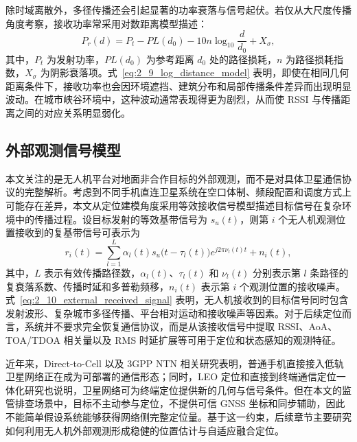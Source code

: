 除时域离散外，多径传播还会引起显著的功率衰落与信号起伏。若仅从大尺度传播角度考察，接收功率常采用对数距离模型描述：
\begin{equation}
P_r(d)
=
P_t
-
PL(d_0)
-
10n\log_{10}\frac{d}{d_0}
+
X_{\sigma},
\label{eq:2_9_log_distance_model}
\end{equation}
其中，$P_t$ 为发射功率，$PL(d_0)$ 为参考距离 $d_0$ 处的路径损耗，$n$ 为路径损耗指数，$X_{\sigma}$ 为阴影衰落项。式~\eqref{eq:2_9_log_distance_model} 表明，即使在相同几何距离条件下，接收功率也会因环境遮挡、建筑分布和局部传播条件差异而出现明显波动。在城市峡谷环境中，这种波动通常表现得更为剧烈，从而使 RSSI 与传播距离之间的对应关系明显弱化\cite{TR38901}。


\subsection{外部观测信号模型}
\label{subsec:2_2_2}

本文关注的是无人机平台对地面非合作目标的外部观测，而不是对具体卫星通信协议的完整解析。考虑到不同手机直连卫星系统在空口体制、频段配置和调度方式上可能存在差异，本文从定位建模角度采用等效接收信号模型描述目标信号在复杂环境中的传播过程。设目标发射的等效基带信号为 \(s_u(t)\)，则第 \(i\) 个无人机观测位置接收到的复基带信号可表示为
\begin{equation}
r_i(t)
=
\sum_{l=1}^{L}
\alpha_l(t)
s_u\big(t-\tau_l(t)\big)
e^{j2\pi \nu_l(t)t}
+
n_i(t),
\label{eq:2_10_external_received_signal}
\end{equation}
其中，\(L\) 表示有效传播路径数，\(\alpha_l(t)\)、\(\tau_l(t)\) 和 \(\nu_l(t)\) 分别表示第 \(l\) 条路径的复衰落系数、传播时延和多普勒频移，\(n_i(t)\) 表示第 \(i\) 个观测位置的接收噪声。式~\eqref{eq:2_10_external_received_signal} 表明，无人机接收到的目标信号同时包含发射波形、复杂城市多径传播、平台相对运动和接收噪声等因素。对于后续定位而言，系统并不要求完全恢复通信协议，而是从该接收信号中提取 RSSI、AoA、TOA/TDOA 相关量以及 RMS 时延扩展等可用于定位和状态感知的观测特征。

近年来，Direct-to-Cell 以及 3GPP NTN 相关研究表明，普通手机直接接入低轨卫星网络正在成为可部署的通信形态\cite{Lin2021NTN,He2024DirectSmartphone,GarciaCabeza2025DirectToCell}；同时，LEO 定位和直接到终端通信定位一体化研究也说明，卫星网络可为终端定位提供新的几何与信号条件\cite{Dureppagari2025LEOPositioning,DeGaudenzi2026D2DPartI,DeGaudenzi2026D2DPartII}。但在本文的监管排查场景中，目标不主动参与定位，不提供可信 GNSS 坐标和同步辅助，因此不能简单假设系统能够获得网络侧完整定位量。基于这一约束，后续章节主要研究如何利用无人机外部观测形成稳健的位置估计与自适应融合定位。

